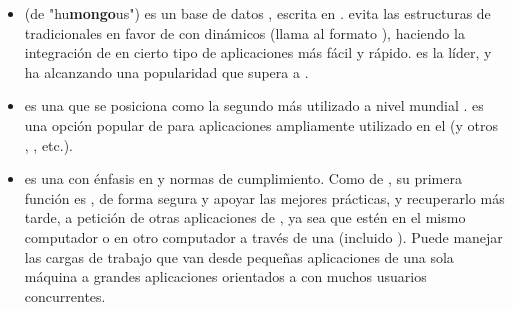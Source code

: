 	\begin{itemize}
		\item
			\textbf{\mongodbNAME} (de "hu\textbf{mongo}us") es un base de datos \documentOriented \openSourcePC, escrita en \cPlusPlus \cite{technology_mongodb}. \mongodbNAME evita las estructuras de \dataBaseDB tradicionales \tableBasedDB en favor de \documentsDB \jsonLikeCPT con \schemasDB dinámicos (\mongodbNAME llama al formato \bsonNAME), haciendo la integración de \dataPC en cierto tipo de aplicaciones más fácil y rápido. \mongodbNAME es la \nosqlNAME líder, y ha alcanzando una popularidad que supera a \postgresql \cite{online_db_engines_ranking}.
	
		\item
			\textbf{\mysqlNAME} es una \rdbms \openSourcePC que se posiciona como la  segundo más utilizado a nivel mundial \cite{online_db_engines_ranking}\cite{online_dispelling_myths}. \mysqlNAME es una opción popular de \dataBaseDB para aplicaciones \webINT ampliamente utilizado en el \stackAS \lampNAME (y otros \stacksAS, \ampNAME, etc.).
	
		\item
			\textbf{\postgresql} es una \ordbms con énfasis en \extensibilityQA y normas de cumplimiento. Como \serverAS de \dataBaseDB, su primera función es \store \dataPC, de forma segura y apoyar las mejores prácticas, y recuperarlo más tarde, a petición de otras aplicaciones de \softwarePC, ya sea que estén \runningCPT en el mismo computador o \runningCPT en otro computador a través  de una \networkINT (incluido \internet). Puede manejar las cargas de trabajo que van desde pequeñas aplicaciones de una sola máquina a grandes aplicaciones orientados a \internet con muchos usuarios concurrentes.
	

\end{itemize}
